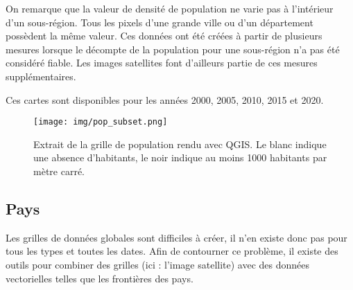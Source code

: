 \documentclass[a4paper, 11pt]{report}
\begin{document}
On remarque que la valeur de densité de population ne varie pas à l'intérieur d'un sous-région. Tous les pixels d'une grande ville ou d'un département possèdent la même valeur. Ces données ont été créées à partir de plusieurs mesures lorsque le décompte de la population pour une sous-région n'a pas été considéré fiable. Les images satellites font d'ailleurs partie de ces mesures supplémentaires.

Ces cartes sont disponibles pour les années 2000, 2005, 2010, 2015 et 2020.

\begin{figure}[h]
	\centering
	\texttt{[image: img/pop\_subset.png]}
	\caption{Extrait de la grille de population \cite{sedac} rendu avec QGIS. Le blanc indique une absence d'habitants, le noir indique au moins 1000 habitants par mètre carré.}
	\label{qgis-sedac}
\end{figure}


\subsection{Pays}
Les grilles de données globales sont difficiles à créer, il n'en existe donc pas pour tous les types et toutes les dates. Afin de contourner ce problème, il existe des outils pour combiner des grilles (ici : l'image satellite) avec des données vectorielles telles que les frontières des pays.
\end{document}
